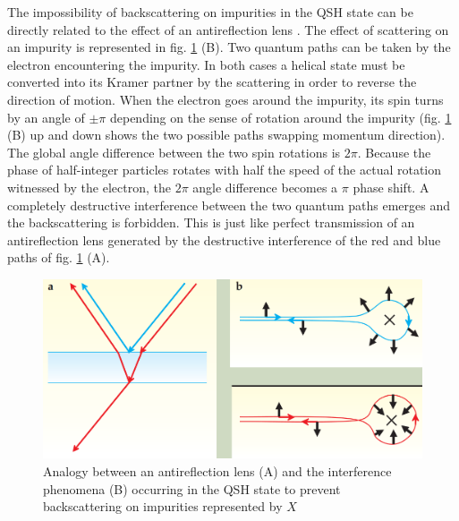 The impossibility of backscattering on impurities in the QSH state can be directly related to the effect of an antireflection lens \cite{qi_quantum_2010}. The effect of scattering on an impurity is represented in fig. \ref{lens} (B). Two quantum paths can be taken by the electron encountering the impurity. In both cases a helical state must be converted into its Kramer partner by the scattering in order to reverse the direction of motion. When the electron goes around the impurity, its spin turns by an angle of $\pm \pi$ depending on the sense of rotation around the impurity (fig. \ref{lens} (B) up and down shows the two possible paths swapping momentum direction). The global angle difference between the two spin rotations is $2\pi$. Because the phase of half-integer particles rotates with half the speed of the actual rotation witnessed by the electron, the $2\pi$ angle difference becomes a $\pi$ phase shift. A completely destructive interference between the two quantum paths emerges \cite{barut_path_1992} and the backscattering is forbidden. This is just like perfect transmission of an antireflection lens generated by the destructive interference of the red and blue paths of fig. \ref{lens} (A). 


\begin{figure}[t]
    \includegraphics[width=\columnwidth]{sections/visuel/lens.png}
    \caption{Analogy between an antireflection lens (A) and the interference phenomena (B) occurring in the QSH state to prevent backscattering on impurities represented by $X$ \cite{qi_quantum_2010}}
    \label{lens}
\end{figure}




